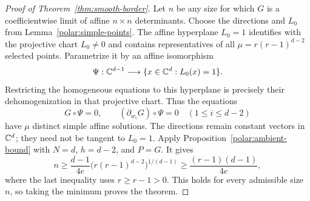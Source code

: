 \begin{proof}[Proof of Theorem~\ref{thm:smooth-border}]
Let $n$ be any size for which $G$ is a coefficientwise limit of affine
$n\times n$ determinants. Choose the directions and $L_0$ from
Lemma~\ref{polar:simple-points}. The affine hyperplane $L_0=1$ identifies
with the projective chart $L_0\ne0$ and contains representatives of all
$\mu=r(r-1)^{d-2}$ selected points. Parametrize it by an affine isomorphism
\[
 \Psi:\mathbb C^{d-1}\longrightarrow\{x\in\mathbb C^d:L_0(x)=1\}.
\]
Restricting the homogeneous equations to this hyperplane is precisely
their dehomogenization in that projective chart. Thus the equations
\[
 G\circ\Psi=0,\qquad
 (\partial_{w_i}G)\circ\Psi=0\quad(1\le i\le d-2)
\]
have $\mu$ distinct simple affine solutions. The directions remain constant
vectors in $\mathbb C^d$; they need not be tangent to $L_0=1$.
Apply Proposition~\ref{polar:ambient-bound} with $N=d$, $h=d-2$, and
$P=G$. It gives
\[
 n\ge\frac{d-1}{4e}
       \bigl(r(r-1)^{d-2}\bigr)^{1/(d-1)}
   \ge\frac{(r-1)(d-1)}{4e},
\]
where the last inequality uses $r\ge r-1>0$. This holds for every
admissible size $n$, so taking the minimum proves the theorem.
\end{proof}
